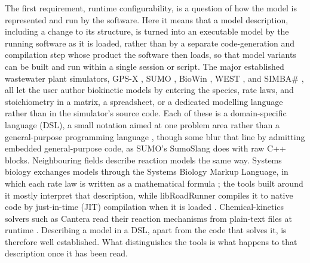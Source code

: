 \documentclass{article}
\begin{document}
The first requirement, runtime configurability, is a question of how the model is represented and run by the software. Here it means that a model description, including a change to its structure, is turned into an executable model by the running software as it is loaded, rather than by a separate code-generation and compilation step whose product the software then loads, so that model variants can be built and run within a single session or script. The major established wastewater plant simulators, GPS-X \citep{gpsx, gpsxug}, SUMO \citep{sumoslang}, BioWin \citep{biowin}, WEST \citep{vanhooren2003, claeys2006tornado, westmodels}, and SIMBA\# \citep{simba}, all let the user author biokinetic models by entering the species, rate laws, and stoichiometry in a matrix, a spreadsheet, or a dedicated modelling language rather than in the simulator's source code. Each of these is a domain-specific language (DSL), a small notation aimed at one problem area rather than a general-purpose programming language \citep{mernik2005}, though some blur that line by admitting embedded general-purpose code, as SUMO's SumoSlang does with raw C++ blocks. Neighbouring fields describe reaction models the same way. Systems biology exchanges models through the Systems Biology Markup Language, in which each rate law is written as a mathematical formula \citep{hucka2003}; the tools built around it \citep{hoops2006, somogyi2015} mostly interpret that description, while libRoadRunner compiles it to native code by just-in-time (JIT) compilation when it is loaded \citep{somogyi2015}. Chemical-kinetics solvers such as Cantera read their reaction mechanisms from plain-text files at runtime \citep{cantera}. Describing a model in a DSL, apart from the code that solves it, is therefore well established. What distinguishes the tools is what happens to that description once it has been read.
\end{document}
